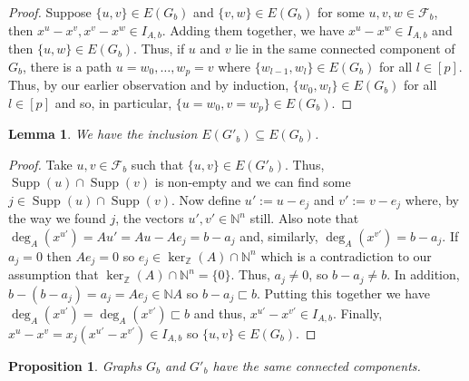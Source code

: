 \documentclass[a4paper, 12pt]{article}
\newcommand{\NN}{\mathbb N}
\newcommand{\ZZ}{\mathbb Z}
\theoremstyle{plain}
\newtheorem{lemma}[theorem]{Lemma}
\newtheorem{proposition}[theorem]{Proposition}
\theoremstyle{definition}
\theoremstyle{remark}
\begin{document}
\begin{proof}
    Suppose $\{u,v\} \in E(G_b)$ and $\{v,w\} \in E(G_b)$ for some $u,v,w \in \mathcal{F}_b$, then $x^{u}-x^{v},x^{v}-x^{w} \in I_{A,b}$. Adding them together, we have $x^{u}-x^{w} \in I_{A,b}$ and then $\{u,w\} \in E(G_b)$. Thus, if $u$ and $v$ lie in the same connected component of $G_b$, there is a path $u=w_0,\dots,w_p=v$ where $\{w_{l-1},w_l\} \in E(G_b)$ for all $l \in [p]$. Thus, by our earlier observation and by induction, $\{w_0,w_l\} \in E(G_b)$ for all $l \in[p]$ and so, in particular, $\{u=w_0,v=w_p\} \in E(G_b)$.
\end{proof}


\begin{lemma} \label{lem:edgeinclusion}
    We have the inclusion $E(G'_b) \subseteq E(G_b)$.
\end{lemma}

\begin{proof}
    Take $u,v \in \mathcal{F}_b$ such that $\{u,v\} \in E(G'_b)$. Thus, $\operatorname{Supp}(u) \cap \operatorname{Supp}(v)$ is non-empty and we can find some $j \in \operatorname{Supp}(u) \cap \operatorname{Supp}(v)$. Now define $u':=u-e_j$ and $v':=v-e_j$ where, by the way we found $j$, the vectors $u',v' \in \NN^n$ still. Also note that $\deg_A(x^{u'})=Au'=Au-Ae_j=b-a_j$ and, similarly, $\deg_A(x^{v'})=b-a_j$. If $a_j=0$ then $Ae_j=0$ so $e_j \in \ker_\ZZ(A) \cap \NN^n$ which is a contradiction to our assumption that $ \ker_\ZZ(A) \cap \NN^n=\{0\}$. Thus, $a_j \neq 0$, so $b-a_j \neq b$. In addition, $b-(b-a_j)=a_j = Ae_j \in \NN A$ so $b-a_j \sqsubset b$. Putting this together we have $\deg_A(x^{u'})=\deg_A(x^{v'}) \sqsubset b$ and thus, $x^{u'}-x^{v'} \in I_{A,b}$. Finally, $x^{u}-x^{v}=x_j(x^{u'}-x^{v'}) \in I_{A,b}$ so $\{u,v\} \in E(G_b)$.
\end{proof}

\begin{proposition} \label{prop:samegraphccs}
    Graphs $G_b$ and $G'_b$ have the same connected components.
\end{proposition}
\end{document}
